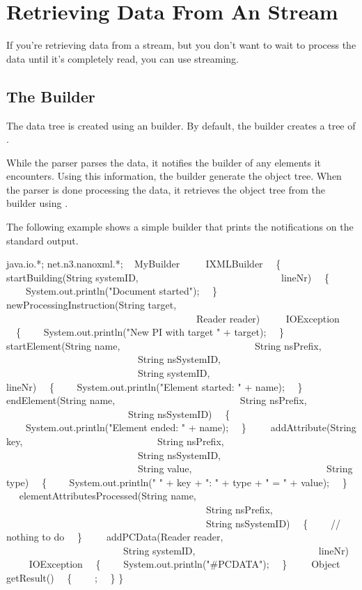 \chapter{Retrieving Data From An \XML{} Stream}

If you're retrieving data from a stream, but you don't want to wait to process the data until it's completely read, you can use streaming.

\section{The \XML{} Builder}

The \XML{} data tree is created using an \XML{} builder. By default, the builder creates a tree of .

While the parser parses the data, it notifies the builder of any elements it encounters. Using this information, the builder generate the object tree. When the parser is done processing the data, it retrieves the object tree from the builder using .

The following example shows a simple builder that prints the notifications on the standard output.

\begin{example}
 java.io.*;
 net.n3.nanoxml.*;
~
 MyBuilder
~~~~ IXMLBuilder
~~\{
~~ startBuilding(String systemID,
~~~~~~~~~~~~~~~~~~~~~~~~~~~~ lineNr)
~~\{
~~~~System.out.println("Document started");
~~\}
~
~~ newProcessingInstruction(String target,
~~~~~~~~~~~~~~~~~~~~~~~~~~~~~~~~~~~~~~~Reader reader)
~~~~ IOException
~~\{
~~~~System.out.println("New PI with target " + target);
~~\}
~
~~ startElement(String name,
~~~~~~~~~~~~~~~~~~~~~~~~~~~String nsPrefix,
~~~~~~~~~~~~~~~~~~~~~~~~~~~String nsSystemID,
~~~~~~~~~~~~~~~~~~~~~~~~~~~String systemID,
~~~~~~~~~~~~~~~~~~~~~~~~~~~ lineNr)
~~\{
~~~~System.out.println("Element started: " + name);
~~\}
~
~~ endElement(String name,
~~~~~~~~~~~~~~~~~~~~~~~~~String nsPrefix,
~~~~~~~~~~~~~~~~~~~~~~~~~String nsSystemID)
~~\{
~~~~System.out.println("Element ended: " + name);
~~\}
~
~~ addAttribute(String key,
~~~~~~~~~~~~~~~~~~~~~~~~~~~String nsPrefix,
~~~~~~~~~~~~~~~~~~~~~~~~~~~String nsSystemID,
~~~~~~~~~~~~~~~~~~~~~~~~~~~String value,
~~~~~~~~~~~~~~~~~~~~~~~~~~~String type)
~~\{
~~~~System.out.println(" " + key + ": " + type + " = " + value);
~~\}
~
~~ elementAttributesProcessed(String name,
~~~~~~~~~~~~~~~~~~~~~~~~~~~~~~~~~~~~~~~~~String nsPrefix,
~~~~~~~~~~~~~~~~~~~~~~~~~~~~~~~~~~~~~~~~~String nsSystemID)
~~\{
~~~~// nothing to do
~~\}
~
~~ addPCData(Reader reader,
~~~~~~~~~~~~~~~~~~~~~~~~String systemID,
~~~~~~~~~~~~~~~~~~~~~~~~ lineNr)
~~~~ IOException
~~\{
~~~~System.out.println("\#PCDATA");
~~\}
~
~~ Object getResult()
~~\{
~~~~;
~~\}
\}
\end{example}

